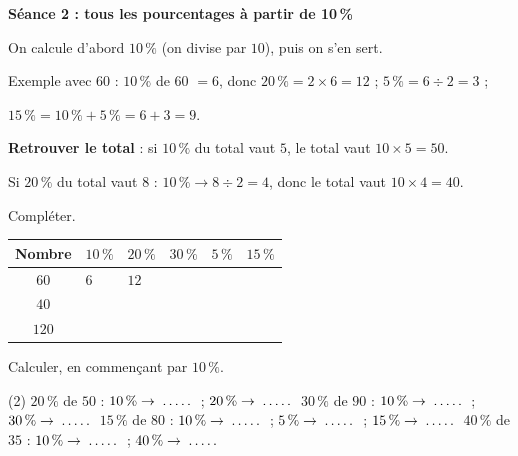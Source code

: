 \documentclass[a4paper,11pt,fleqn]{article}
\renewcommand{\arraystretch}{1.5}
\newcommand{\pt}[1][1.6cm]{\makebox[#1]{\dotfill}}
\newcommand{\seance}[1]{{\large\bfseries\textcolor{couleur_theme}{#1}}\par\smallskip}
\begin{document}


\seance{Séance 2 : tous les pourcentages à partir de 10\,\%}

\begin{tcolorbox}[colback=white, colframe=couleur_theme, title=\textbf{Rappel}, fonttitle=\bfseries]
On calcule d'abord $10\,\%$ (on divise par $10$), puis on s'en sert.

\smallskip
Exemple avec $60$ : \quad $10\,\%$ de $60$ $= 6$, \quad donc \quad
$20\,\% = 2 \times 6 = 12$ ; \quad $5\,\% = 6 \div 2 = 3$ ;

\hspace*{7.6em}$15\,\% = 10\,\% + 5\,\% = 6 + 3 = 9$.

\smallskip
\textbf{Retrouver le total} : si $10\,\%$ du total vaut $5$, le total vaut $10 \times 5 = 50$.

Si $20\,\%$ du total vaut $8$ : \quad $10\,\% \to 8 \div 2 = 4$, \quad donc le total vaut $10 \times 4 = 40$.
\end{tcolorbox}

\begin{EXO}{}{}
Compléter.

\begin{center}
\renewcommand{\arraystretch}{1.5}
\begin{tabular}{|c|*{5}{C{2.2cm}|}}
	\hline
	Nombre & $10\,\%$ & $20\,\%$ & $30\,\%$ & $5\,\%$ & $15\,\%$ \\ \hline
	$60$ & $6$ & $12$ & & & \\ \hline
	$40$ & & & & & \\ \hline
	$120$ & & & & & \\ \hline
\end{tabular}
\end{center}
\end{EXO}

\begin{EXO}{}{}
Calculer, en commençant par $10\,\%$.

\begin{tasks}[label=\textbf{\alph*.}, item-indent=2em, after-item-skip=0.5em](2)
	\task $20\,\%$ de $50$ : \enspace $10\,\% \to \pt[0.9cm]$ ; \enspace $20\,\% \to \pt[0.9cm]$
	\task $30\,\%$ de $90$ : \enspace $10\,\% \to \pt[0.9cm]$ ; \enspace $30\,\% \to \pt[0.9cm]$
	\task* $15\,\%$ de $80$ : \enspace $10\,\% \to \pt[0.9cm]$ ; \enspace $5\,\% \to \pt[0.9cm]$ ; \enspace $15\,\% \to \pt[0.9cm]$
	\task $40\,\%$ de $35$ : \enspace $10\,\% \to \pt[0.9cm]$ ; \enspace $40\,\% \to \pt[0.9cm]$
\end{tasks}
\end{EXO}
\end{document}
